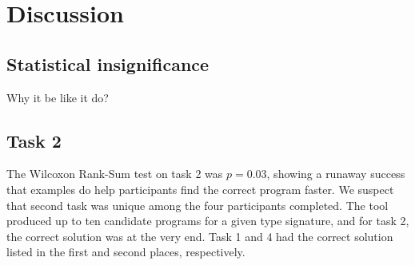 \section{Discussion}
\label{sec:discussion}

\subsection{Statistical insignificance}
Why it be like it do?

\subsection{Task 2}
The Wilcoxon Rank-Sum test on task 2 was $p=0.03$, showing a runaway success
that examples do help participants find the correct program faster.
%
We suspect that second task was unique among the four participants completed.
%
The tool produced up to ten candidate programs for a given type signature, and
for task 2, the correct solution was at the very end.
%
Task 1 and 4 had the correct solution listed in the first and second places,
respectively.
